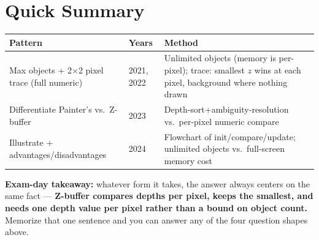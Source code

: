 \documentclass[12pt, a4paper]{article}
\newenvironment{notesbox}{\begin{mdframed}[style=notesframe]}{\end{mdframed}}
\begin{document}
\section{Quick Summary}
\begin{center}
\renewcommand{\arraystretch}{1.3}
\begin{tabular}{p{4cm}|p{2.2cm}|p{7.3cm}}
\toprule
\textbf{Pattern} & \textbf{Years} & \textbf{Method} \\
\midrule
Max objects + 2$\times$2 pixel trace (full numeric) & 2021, 2022 & Unlimited objects (memory is per-pixel); trace: smallest $z$ wins at each pixel, background where nothing drawn \\
Differentiate Painter's vs.\ Z-buffer & 2023 & Depth-sort+ambiguity-resolution vs.\ per-pixel numeric compare \\
Illustrate + advantages/disadvantages & 2024 & Flowchart of init/compare/update; unlimited objects vs.\ full-screen memory cost \\
\bottomrule
\end{tabular}
\end{center}
\begin{notesbox}
\textbf{Exam-day takeaway:} whatever form it takes, the answer always centers on the same fact --- \textbf{Z-buffer compares depths per pixel, keeps the smallest, and needs one depth value per pixel rather than a bound on object count.} Memorize that one sentence and you can answer any of the four question shapes above.
\end{notesbox}
\end{document}
